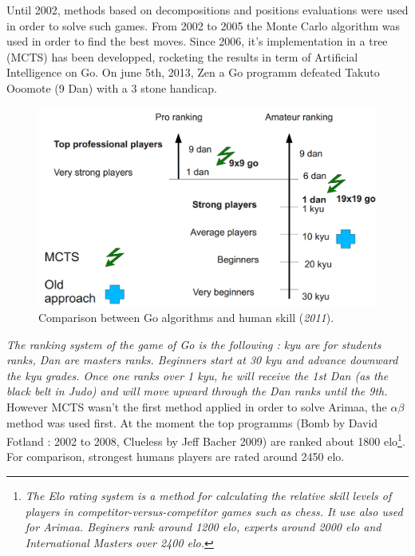 \label{third part part}
Until 2002, methods based on decompositions and positions evaluations were used in order to solve such games. From 2002 to 2005 the Monte Carlo algorithm was used in order to find the best moves. Since 2006, it's implementation in a tree (MCTS) has been developped, rocketing the results in term of Artificial Intelligence on Go. On june 5th, 2013, Zen a Go programm defeated Takuto Ooomote (9 Dan) with a 3 stone handicap.\cite{computer_Go_vs_human}
\begin{figure}[H]
\centering
\includegraphics[width=12cm]{2_State_of_the_art/Arimaa_on_MCTS_Benoit/img/ranking.png}
\caption{\label{fig:ranking}Comparison between Go algorithms and human skill (\textit{2011})\cite{graphic_MCTS_Go}.}
\end{figure}
\textit{The ranking system of the game of Go is the following : kyu are for students ranks, Dan are masters ranks. Beginners start at 30 kyu and advance downward the kyu grades. Once one ranks over 1 kyu, he will receive the 1st Dan (as the black belt in Judo) and will move upward through the Dan ranks until the 9th.}\bigskip
\\
However MCTS wasn't the first method applied in order to solve Arimaa, the \ensuremath{\alpha\beta} method was used first. At the moment the top programms (Bomb by David Fotland : 2002 to 2008, Clueless by Jeff Bacher 2009) are ranked about 1800 elo\footnote{\textit{The Elo rating system is a method for calculating the relative skill levels of players in competitor-versus-competitor games such as chess. It use also used for Arimaa. Beginers rank around 1200 elo, experts around 2000 elo and International Masters over 2400 elo.}}. For comparison, strongest humans players are rated around 2450 elo.\cite{master_mcts_kozeleck}
\medskip

